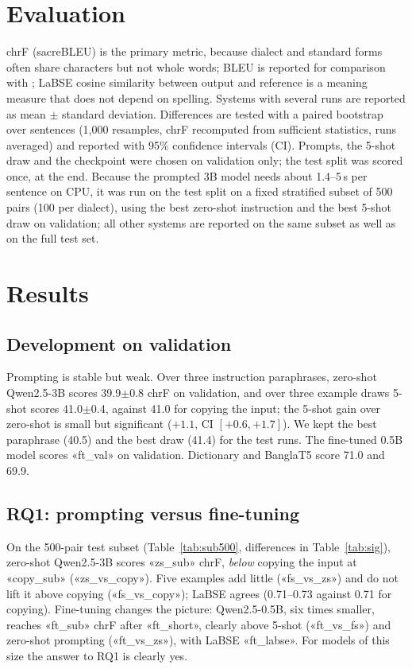 \documentclass[10pt,twocolumn]{article}
\newcommand{\pmsd}[1]{{\scriptsize$\pm$#1}}
\begin{document}
\section{Evaluation}
chrF \cite{chrf} (sacreBLEU) is the primary metric, because dialect and standard forms often share
characters but not whole words; BLEU is reported for comparison with \cite{vashantor}; LaBSE \cite{labse}
cosine similarity between output and reference is a meaning measure that does not depend on spelling.
Systems with several runs are reported as mean $\pm$ standard deviation. Differences are tested with a
paired bootstrap over sentences (1,000 resamples, chrF recomputed from sufficient statistics, runs averaged)
and reported with 95\% confidence intervals (CI). Prompts, the 5-shot draw and the checkpoint were chosen on
validation only; the test split was scored once, at the end. Because the prompted 3B model needs about
1.4--5\,s per sentence on CPU, it was run on the test split on a fixed stratified subset of 500 pairs
(100 per dialect), using the best zero-shot instruction and the best 5-shot draw on validation; all other
systems are reported on the same subset as well as on the full test set.

\section{Results}
\subsection{Development on validation}
Prompting is stable but weak. Over three instruction paraphrases, zero-shot Qwen2.5-3B scores
39.9\pmsd{0.8} chrF on validation, and over three example draws 5-shot scores 41.0\pmsd{0.4}, against 41.0
for copying the input; the 5-shot gain over zero-shot is small but significant ($+1.1$, CI $[+0.6, +1.7]$).
We kept the best paraphrase (40.5) and the best draw (41.4) for the test runs. The fine-tuned 0.5B model
scores «ft_val» on validation. Dictionary and BanglaT5 score 71.0 and 69.9.




\subsection{RQ1: prompting versus fine-tuning}
On the 500-pair test subset (Table~\ref{tab:sub500}, differences in Table~\ref{tab:sig}), zero-shot
Qwen2.5-3B scores «zs_sub» chrF, \emph{below} copying the input at «copy_sub» («zs_vs_copy»). Five examples
add little («fs_vs_zs») and do not lift it above copying («fs_vs_copy»); LaBSE agrees (0.71--0.73 against
0.71 for copying). Fine-tuning changes the picture: Qwen2.5-0.5B, six times smaller, reaches «ft_sub» chrF
after «ft_short», clearly above 5-shot («ft_vs_fs») and zero-shot prompting («ft_vs_zs»), with LaBSE
«ft_labse».
For models of this size the answer to RQ1 is clearly yes.
\end{document}
